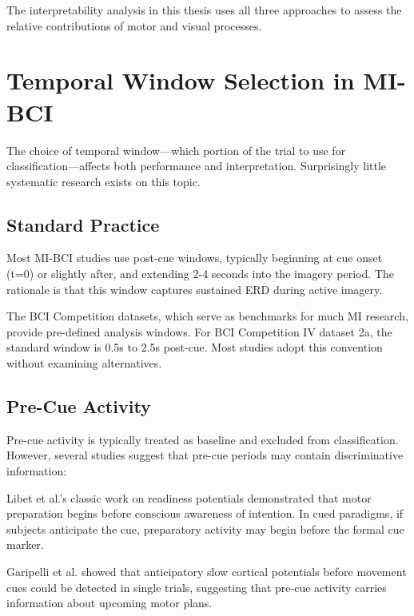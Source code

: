 The interpretability analysis in this thesis uses all three approaches to assess the relative contributions of motor and visual processes.


\section{Temporal Window Selection in MI-BCI}
\label{sec:rw_temporal}

The choice of temporal window—which portion of the trial to use for classification—affects both performance and interpretation. Surprisingly little systematic research exists on this topic.


\subsection{Standard Practice}
\label{subsec:rw_standard_windows}

Most MI-BCI studies use post-cue windows, typically beginning at cue onset (t=0) or slightly after, and extending 2-4 seconds into the imagery period. The rationale is that this window captures sustained ERD during active imagery.

The BCI Competition datasets, which serve as benchmarks for much MI research, provide pre-defined analysis windows. For BCI Competition IV dataset 2a, the standard window is 0.5s to 2.5s post-cue. Most studies adopt this convention without examining alternatives.


\subsection{Pre-Cue Activity}
\label{subsec:rw_precue}

Pre-cue activity is typically treated as baseline and excluded from classification. However, several studies suggest that pre-cue periods may contain discriminative information:

Libet et al.'s classic work on readiness potentials \cite{libet1983time} demonstrated that motor preparation begins before conscious awareness of intention. In cued paradigms, if subjects anticipate the cue, preparatory activity may begin before the formal cue marker.

Garipelli et al. \cite{garipelli2013single} showed that anticipatory slow cortical potentials before movement cues could be detected in single trials, suggesting that pre-cue activity carries information about upcoming motor plans.


